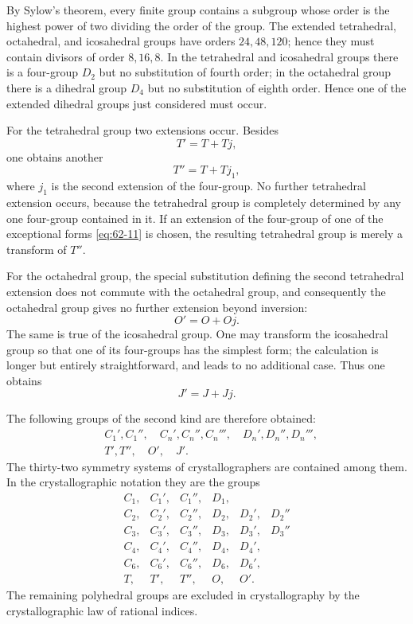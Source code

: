 \documentclass[11pt,a4paper]{book}
\begin{document}
By Sylow's theorem, every finite group contains a subgroup whose order is the highest power of two dividing the order of the group.  The extended tetrahedral, octahedral, and icosahedral groups have orders \(24,48,120\); hence they must contain divisors of order \(8,16,8\).  In the tetrahedral and icosahedral groups there is a four-group \(D_2\) but no substitution of fourth order; in the octahedral group there is a dihedral group \(D_4\) but no substitution of eighth order.  Hence one of the extended dihedral groups just considered must occur.

For the tetrahedral group two extensions occur.  Besides
\[
 T'=T+Tj,
\]
one obtains another
\[
 T''=T+Tj_1,
\]
where \(j_1\) is the second extension of the four-group.  No further tetrahedral extension occurs, because the tetrahedral group is completely determined by any one four-group contained in it.  If an extension of the four-group of one of the exceptional forms \eqref{eq:62-11} is chosen, the resulting tetrahedral group is merely a transform of \(T''\).

For the octahedral group, the special substitution defining the second tetrahedral extension does not commute with the octahedral group, and consequently the octahedral group gives no further extension beyond inversion:
\[
 O'=O+Oj.
\]
The same is true of the icosahedral group.  One may transform the icosahedral group so that one of its four-groups has the simplest form; the calculation is longer but entirely straightforward, and leads to no additional case.  Thus one obtains
\[
 J'=J+Jj.
\]

The following groups of the second kind are therefore obtained:
\begin{align*}
& C_1',C_1'',\quad C_n',C_n'',C_n''',\quad D_n',D_n'',D_n''',\\
& T',T'',\quad O',\quad J'.
\end{align*}
The thirty-two symmetry systems of crystallographers are contained among them.  In the crystallographic notation they are the groups
\[
\begin{array}{llllll}
 C_1, & C_1', & C_1'', & D_1, & & \\
 C_2, & C_2', & C_2'', & D_2, & D_2', & D_2'' \\
 C_3, & C_3', & C_3'', & D_3, & D_3', & D_3'' \\
 C_4, & C_4', & C_4'', & D_4, & D_4', & \\
 C_6, & C_6', & C_6'', & D_6, & D_6', & \\
 T, & T', & T'', & O, & O'. &
\end{array}
\]
The remaining polyhedral groups are excluded in crystallography by the crystallographic law of rational indices.
\end{document}

